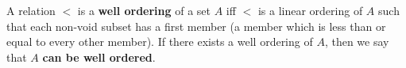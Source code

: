 A relation $<$ is a \textbf{well ordering} of a set $A$ iff $<$ is a linear ordering of $A$ such that each non-void subset has a first member (a member which is less than or equal to every other member). If there exists a well ordering of $A$, then we say that $A$ \textbf{can be well ordered}.
